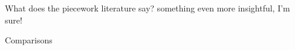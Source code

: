 \documentclass[presentation]{subfiles}
\begin{document}
\begin{frame}{What does the piecework literature say?}
    something even more insightful, I'm sure!
\end{frame}

\begin{frame}{Comparisons}



\end{frame}
\end{document}
